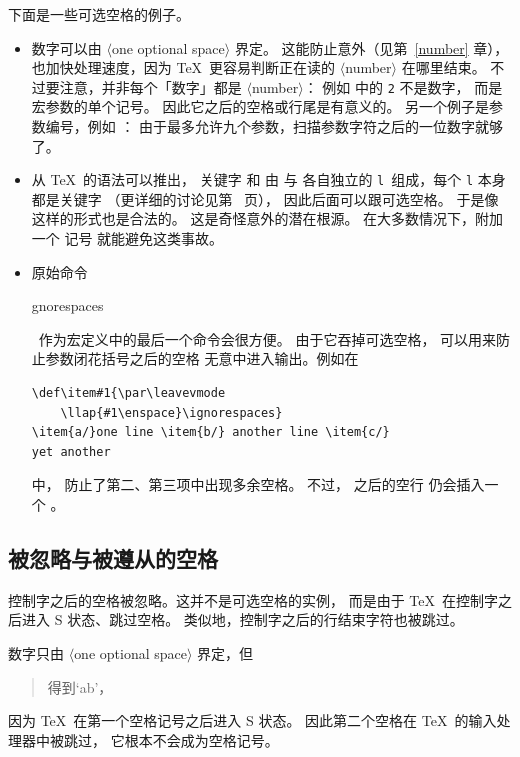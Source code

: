 \documentclass[a4paper]{rapport3}
\makeatletter
\def\gr#1{$\langle$#1$\rangle$}\def\key#1{{\tt#1}}
\newenvironment{disp}{\begin{quotation}}{\end{quotation}}
\def\gram#1{\gr{#1}}%
\def\cstoidx#1\par{\index{#1@\cs{#1}}}
\makeatother
\begin{document}
下面是一些可选空格的例子。

\begin{itemize} 
\item 数字可以由 \gr{one optional space} 界定。
这能防止意外（见第~\ref{number} 章），
也加快处理速度，因为 \TeX\ 更容易判断正在读的
\gram{number} 在哪里结束。
不过要注意，并非每个「数字」都是 \gram{number}：
例如  中的 {\tt 2} 不是数字，
而是  宏参数的单个记号。
因此它之后的空格或行尾是有意义的。
另一个例子是参数编号，例如 ：
由于最多允许九个参数，扫描参数字符之后的一位数字就够了。

\item 从 \TeX\ 的语法可以推出，
关键字  和  由  与
各自独立的 {\tt l}$\,$ 组成，每个 {\tt l} 本身都是关键字
（更详细的讨论见第~\pageref{keywords} 页），
因此后面可以跟可选空格。
于是像 \hbox{} 这样的形式也是合法的。
这是奇怪意外的潜在根源。
在大多数情况下，附加一个  记号
就能避免这类事故。

\item 原始命令 \cstoidx ignorespaces\par\
作为宏定义中的最后一个命令会很方便。
由于它吞掉可选空格，
可以用来防止参数闭花括号之后的空格
无意中进入输出。例如在
\begin{verbatim}
\def\item#1{\par\leavevmode
    \llap{#1\enspace}\ignorespaces}
\item{a/}one line \item{b/} another line \item{c/}
yet another
\end{verbatim} 
中， 防止了第二、第三项中出现多余空格。
不过，\cs{ignorespaces} 之后的空行
仍会插入一个 。
\end{itemize}
\awp

\subsection{被忽略与被遵从的空格}

控制字之后的空格被忽略。这并不是可选空格的实例，
而是由于 \TeX\ 在控制字之后进入 {\italic S} 状态、跳过空格。
类似地，控制字之后的行结束字符也被跳过。

数字只由 \gr{one optional space} 界定，但
\begin{disp}\quad 得到\quad `ab'，\end{disp}
因为 \TeX\ 在第一个空格记号之后进入 {\italic S} 状态。
因此第二个空格在 \TeX\ 的输入处理器中被跳过，
它根本不会成为空格记号。
\end{document}

